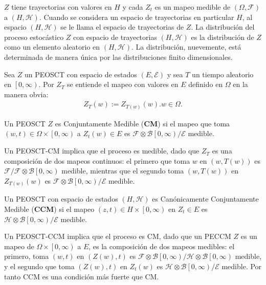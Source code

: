 $Z$ tiene trayectorias con valores en $H$ y cada $Z_{t}$ es un mapeo medible de $\left(\Omega,\mathcal{F}\right)$ a $\left(H,\mathcal{H}\right)$. Cuando se considera un espacio de trayectorias en particular $H$, al espacio $\left(H,\mathcal{H}\right)$ se le llama el espacio de trayectorias de $Z$. La distribuci\'on del proceso estoc\'astico $Z$ con espacio de trayectorias $\left(H,\mathcal{H}\right)$ es la distribuci\'on de $Z$ como  un elemento aleatorio en $\left(H,\mathcal{H}\right)$. La distribuci\'on, nuevemente, est\'a determinada de manera \'unica por las distribuciones finito dimensionales.

\begin{Def}
Sea $Z$ un PEOSCT  con espacio de estados $\left(E,\mathcal{E}\right)$ y sea $T$ un tiempo aleatorio en $\left[0,\infty\right)$. Por $Z_{T}$ se entiende el mapeo con valores en $E$ definido en $\Omega$ en la manera obvia:
\begin{eqnarray*}
Z_{T}\left(w\right):=Z_{T\left(w\right)}\left(w\right). w\in\Omega.
\end{eqnarray*}
\end{Def}

\begin{Def}
Un PEOSCT $Z$ es Conjuntamente Medible (\textbf{CM}) si el mapeo que toma $\left(w,t\right)\in\Omega\times\left[0,\infty\right)$ a $Z_{t}\left(w\right)\in E$ es $\mathcal{F}\otimes\mathcal{B}\left[0,\infty\right)/\mathcal{E}$ medible.
\end{Def}

Un PEOSCT-CM implica que el proceso es medible, dado que $Z_{T}$ es una composici\'on  de dos mapeos continuos: el primero que toma $w$ en $\left(w,T\left(w\right)\right)$ es $\mathcal{F}/\mathcal{F}\otimes\mathcal{B}\left[0,\infty\right)$ medible, mientras que el segundo toma $\left(w,T\left(w\right)\right)$ en $Z_{T\left(w\right)}\left(w\right)$ es $\mathcal{F}\otimes\mathcal{B}\left[0,\infty\right)/\mathcal{E}$ medible.

\begin{Def}
Un PEOSCT con espacio de estados $\left(H,\mathcal{H}\right)$ es Can\'onicamente Conjuntamente Medible (\textbf{CCM}) si el mapeo $\left(z,t\right)\in H\times\left[0,\infty\right)$ en $Z_{t}\in E$ es $\mathcal{H}\otimes\mathcal{B}\left[0,\infty\right)/\mathcal{E}$ medible.
\end{Def}

Un PEOSCT-CCM implica que el proceso es CM, dado que un PECCM $Z$ es un mapeo de $\Omega\times\left[0,\infty\right)$ a $E$, es la composici\'on de dos mapeos medibles: el primero, toma $\left(w,t\right)$ en $\left(Z\left(w\right),t\right)$ es $\mathcal{F}\otimes\mathcal{B}\left[0,\infty\right)/\mathcal{H}\otimes\mathcal{B}\left[0,\infty\right)$ medible, y el segundo que toma $\left(Z\left(w\right),t\right)$  en $Z_{t}\left(w\right)$ es $\mathcal{H}\otimes\mathcal{B}\left[0,\infty\right)/\mathcal{E}$ medible. Por tanto CCM es una condici\'on m\'as fuerte que CM.

